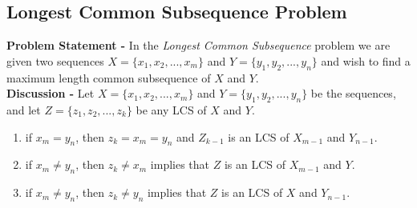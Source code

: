 \documentclass[10pt,a4paper,draft]{article}
\begin{document}
\subsection{Longest Common Subsequence Problem}
\textbf{Problem Statement -} In the \emph{Longest Common Subsequence} problem we are given two sequences $X=\{x_1,x_2,...,x_m\}$ and $Y=\{y_1,y_2,...,y_n\}$ and wish to find a maximum length common subsequence of $X$ and $Y$.
\\[12pt]
\textbf{Discussion -} Let  $X=\{x_1,x_2,...,x_m\}$ and $Y=\{y_1,y_2,...,y_n\}$ be the sequences, and let $Z=\{z_1,z_2,...,z_k\}$ be any LCS of $X$ and $Y$.
\begin{enumerate}
\item if $x_m=y_n$, then $z_k=x_m=y_n$ and $Z_{k-1}$ is an LCS of $X_{m-1}$ and $Y_{n-1}$.
\item if $x_m \neq y_n$, then $z_k \neq x_m$ implies that $Z$ is an LCS of $X_{m-1}$ and $Y$.
\item if $x_m \neq y_n$, then $z_k \neq y_n$ implies that $Z$ is an LCS of $X$ and $Y_{n-1}$.
\end{enumerate}
\end{document}
